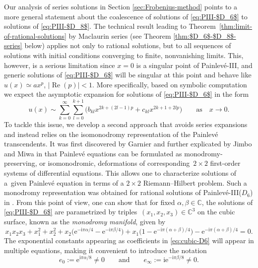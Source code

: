 \documentclass[pdftex]{sigma}
\numberwithin{equation}{section}
\newcommand{\ee}{\mathrm{e}}
\newcommand{\ii}{\mathrm{i}}
\newcommand{\C}{{\mathbb{C}}}
\newcommand{\re}{\operatorname{Re}}
\begin{document}
Our analysis of series solutions in Section \ref{sec:Frobenius-method} points to a more general statement about the coalescence of solutions of \eqref{eq:PIII-$D_6$} to solutions of \eqref{eq:PIII-$D_8$}. The technical result leading to Theorem~\ref{thm:limit-of-rational-solutions} by Maclaurin series (see Theorem \ref{thm:$D_6$-$D_8$-series} below) applies not only to rational solutions, but to all sequences of solutions with initial conditions converging to finite, nonvanishing limits. This, however, is a serious limitation since $x = 0$ is a singular point of Painlev\'e-III, and generic solutions of \eqref{eq:PIII-$D_6$} will be singular at this point and behave like $u(x)\simeq ax^p$, $|{\re}(p)|< 1$. More specifically, based on symbolic computation we expect the asymptotic expansion for solutions of \eqref{eq:PIII-$D_6$} in the form
\[
u(x)\sim \sum_{k=0}^{\infty}\sum_{l=0}^{k+1}\big(b_{kl}x^{2k+(2l-1)p}+c_{kl}x^{2k+1+2lp}\big) \qquad \text{as}\quad x\to 0.
\]
To tackle this issue, we develop a second approach that avoids series expansions and instead relies on the isomonodromy representation of the Painlev\'e transcendents. It was first discovered by Garnier \cite{MR1509146} and further explicated by Jimbo and Miwa in \cite{MR625446} that Painlev\'e equations can be formulated as monodromy-preserving, or isomonodromic, deformations of corresponding~${2 \times 2}$ first-order systems of differential equations. This allows one to characterize solutions of a~given Painlev\'e equation in terms of a $2\times 2$ Riemann--Hilbert problem. Such a monodromy representation was obtained for rational solutions of Painlev\'e-III($D_6$) in \cite{BMS18}. From this point of view, one can show that for fixed $\alpha, \beta \in \C$, the solutions of \eqref{eq:PIII-$D_6$} are parametrized by triples~$(x_1, x_2, x_3) \in \C^3$ on the cubic surface, known as the \emph{monodromy manifold}, given by
\begin{equation}
 \label{eq:cubic-D6} x_1x_2x_3+x_1^2+x_2^2+x_2 \bigl(\ee^{-{\ii\pi \alpha}/{4}}-\ee^{-{\ii\pi \beta}/{4}} \bigr)+x_1 \bigl(1-\ee^{-{\ii\pi(\alpha+ \beta)}/{4}}\bigr)-\ee^{-{\ii\pi(\alpha+ \beta)}/{4}}=0.
\end{equation}
The exponential constants appearing as coefficients in \eqref{eq:cubic-D6} will appear in multiple equations, making it convenient to introduce the notation
\begin{equation}
 e_0:=\ee^{{\ii\pi\alpha}/{8}}\neq 0 \qquad \text{and} \qquad e_\infty:=\ii\ee^{-{\ii\pi\beta}/{8}}\neq 0.
 \label{eq:e0-einfty-alpha-beta}
\end{equation}
\end{document}
